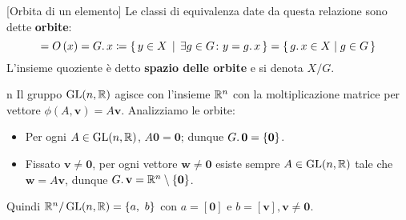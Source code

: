 \begin{definition}{}[Orbita di un elemento]
	Le classi di equivalenza date da questa relazione sono dette \textbf{orbite}:
		\begin{equation*}
			[x]=O\left(x\right)=G\ldotp x\coloneqq\Set{y\in X | \exists g\in G \colon y=g\ldotp x}=\Set{ g\ldotp x\in X\mid g\in G}
		\end{equation*}
	L'insieme quoziente è detto \textbf{spazio delle orbite} e si denota $X/G$.
\end{definition}
\begin{example}{n}
	Il gruppo $\operatorname{GL}(n,\mathbb{R})$ agisce con l'insieme $\mathbb{R}^n$ con la moltiplicazione matrice per vettore $\phi(A,\mathbf{v})=A\mathbf{v}$. Analizziamo le orbite:
	\begin{itemize}
		\item Per ogni $A\in\operatorname{GL}(n,\mathbb{R})$, $A\mathbf{0}=\mathbf{0}$; dunque $G\ldotp\mathbf{0}=\{\mathbf{0}\}$.
		\item Fissato $\mathbf{v}\neq \mathbf{0}$, per ogni vettore $\mathbf{w}\neq\mathbf{0}$ esiste sempre $A\in\operatorname{GL}(n,\mathbb{R})$ tale che $\mathbf{w}=A\mathbf{v}$, dunque $G\ldotp\mathbf{v}=\mathbb{R}^n\setminus\{\mathbf{0}\}$.
	\end{itemize}
	Quindi $\mathbb{R}^n/\operatorname{GL}(n, \mathbb{R})=\{ a,\ b\}$ con $a=[\mathbf{0}]$ e $b=[\mathbf{v}], \mathbf{v\neq 0}$.
\end{example}
